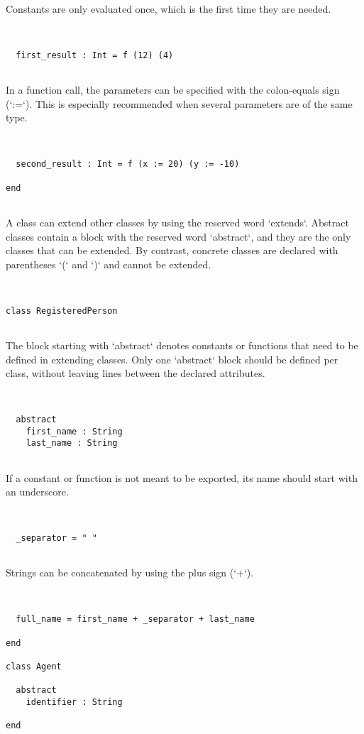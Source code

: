 \documentclass[12pt,a4paper]{article}
\begin{document}
Constants are only evaluated once, which is the first time they are needed.


\begin{lstlisting}


  first_result : Int = f (12) (4)


\end{lstlisting}

In a function call, the parameters can be specified with the colon-equals sign (`:=`).
This is especially recommended when several parameters are of the same type.


\begin{lstlisting}


  second_result : Int = f (x := 20) (y := -10)

end


\end{lstlisting}

A class can extend other classes by using the reserved word `extends`.
Abstract classes contain a block with the reserved word `abstract`, and they are the only
classes that can be extended.
By contrast, concrete classes are declared with parentheses `(` and `)` and cannot be
extended.


\begin{lstlisting}


class RegisteredPerson


\end{lstlisting}

The block starting with `abstract` denotes constants or functions that need to be defined
in extending classes. Only one `abstract` block should be defined per class, without
leaving lines between the declared attributes.


\begin{lstlisting}


  abstract
    first_name : String
    last_name : String


\end{lstlisting}

If a constant or function is not meant to be exported, its name should start with an
underscore.


\begin{lstlisting}


  _separator = " "


\end{lstlisting}

Strings can be concatenated by using the plus sign (`+`).


\begin{lstlisting}


  full_name = first_name + _separator + last_name

end

class Agent

  abstract
    identifier : String

end


\end{lstlisting}
\end{document}
